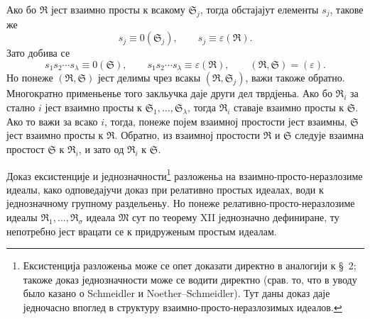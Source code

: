 ﻿\documentclass[11pt]{article}
\newcommand{\ideal}[1]{\mathfrak{#1}}
\begin{document}
Ако бо \(\ideal R\) јест взаимно просты к всакому \(\ideal S_j\), тогда обстајајут елементы \(s_j\), такове же
\[
 s_j\equiv0(\ideal S_j),
 \qquad
 s_j\equiv\varepsilon(\ideal R).
\]
Зато добива се
\[
 s_1s_2\cdots s_\lambda\equiv0(\ideal S),
 \qquad
 s_1s_2\cdots s_\lambda\equiv\varepsilon(\ideal R),
 \qquad
 (\ideal R,\ideal S)=(\varepsilon).
\]
Но понеже \((\ideal R,\ideal S)\) јест делимы чрез всакы \((\ideal R,\ideal S_j)\), важи такоже обратно. Многократно применьенье того закльучка даје други дел тврдјеньа. Ако бо \(\ideal R_i\) за стално \(i\) јест взаимно просты к \(\ideal S_1,\ldots,\ideal S_\lambda\), тогда \(\ideal R_i\) ставаје взаимно просты к \(\ideal S\). Ако то важи за всако \(i\), тогда, понеже појем взаимној простости јест взаимны, \(\ideal S\) јест взаимно просты к \(\ideal R\). Обратно, из взаимној простости \(\ideal R\) и \(\ideal S\) следује взаимна простост \(\ideal S\) к \(\ideal R_i\), и зато од \(\ideal R_i\) к \(\ideal S\).

Доказ ексистенције и једнозначности\footnote{Ексистенција разложеньа може се опет доказати директно в аналогији к \S~2; такоже доказ једнозначности може се водити директно (срав. то, что в уводу было казано о Schmeidler и Noether--Schmeidler). Тут даны доказ даје једночасно впоглед в структуру взаимно-просто-неразлозимых идеалов.} разложеньа на взаимно-просто-неразлозиме идеалы, како одповедајучи доказ при релативно простых идеалах, води к једнозначному групному раздельеньу. Но понеже релативно-просто-неразлозиме идеалы \(\ideal R_1,\ldots,\ideal R_\sigma\) идеала \(\ideal M\) сут по теорему XII једнозначно дефиниране, ту непотребно јест врацати се к придруженым простым идеалам.
\end{document}
